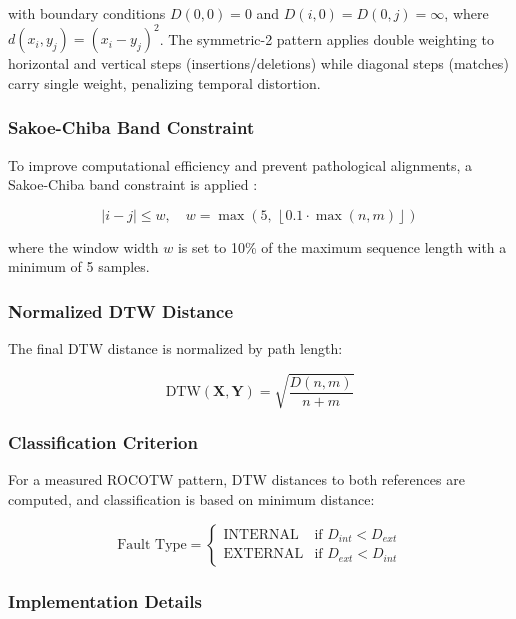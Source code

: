 \documentclass[journal]{IEEEtran}
\begin{document}
with boundary conditions $D(0,0) = 0$ and $D(i,0) = D(0,j) = \infty$,
where $d(x_i, y_j) = (x_i - y_j)^2$. The symmetric-2 pattern applies
double weighting to horizontal and vertical steps (insertions/deletions)
while diagonal steps (matches) carry single weight, penalizing temporal
distortion.

\subsubsection{Sakoe-Chiba Band Constraint}

To improve computational efficiency and prevent pathological alignments,
a Sakoe-Chiba band constraint is applied \cite{sakoe1978}:

\begin{equation}
|i - j| \leq w, \quad w = \max\!\left(5,\,\left\lfloor 0.1 \cdot 
\max(n,m) \right\rfloor\right)
\end{equation}

where the window width $w$ is set to 10\% of the maximum sequence length
with a minimum of 5 samples.

\subsubsection{Normalized DTW Distance}

The final DTW distance is normalized by path length:

\begin{equation}
\text{DTW}(\mathbf{X}, \mathbf{Y}) = \sqrt{\frac{D(n,m)}{n + m}}
\end{equation}

\subsubsection{Classification Criterion}

For a measured ROCOTW pattern, DTW distances to both references are
computed, and classification is based on minimum distance:

\begin{equation}
\text{Fault Type} = \begin{cases}
\text{INTERNAL} & \text{if } D_{int} < D_{ext} \\
\text{EXTERNAL} & \text{if } D_{ext} < D_{int}
\end{cases}
\end{equation}

\subsubsection{Implementation Details}
\end{document}
